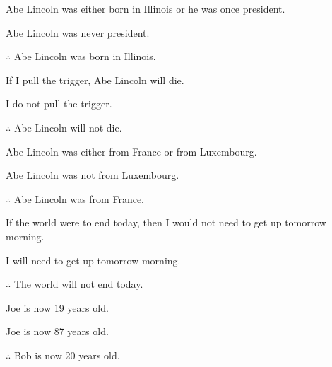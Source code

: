 \begin{practiceproblems}
\begin{earg}
\item Abe Lincoln was either born in Illinois or he was once president.
\item Abe Lincoln was never president.
\item[$\therefore$] Abe Lincoln was born in Illinois. \hfill {}
\end{earg}

\begin{earg}
\item If I pull the trigger, Abe Lincoln will die.
\item I do not pull the trigger.
\item[$\therefore$] Abe Lincoln will not die. \hfill {}
\end{earg}

\begin{earg}
\item Abe Lincoln was either from France or from Luxembourg.
\item Abe Lincoln was not from Luxembourg.
\item[$\therefore$] Abe Lincoln was from France. \hfill {}
\end{earg}

\begin{earg}
\item If the world were to end today, then I would not need to get up tomorrow morning.
\item I will need to get up tomorrow morning.
\item[$\therefore$] The world will not end today. \hfill {}
\end{earg}

\begin{earg}
\item Joe is now 19 years old.
\item Joe is now 87 years old.
\item[$\therefore$] Bob is now 20 years old. \hfill {}
\\
\end{earg}




\end{practiceproblems}
